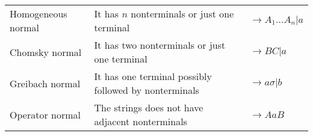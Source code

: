 \begin{table}[H]
{\begin{tabular}{lll}
    Homogeneous normal                & It has $n$ nonterminals or just one terminal                & $\rightarrow A_1 \dots A_n | a$        \\
    Chomsky normal                    & It has two nonterminals or just one terminal                & $\rightarrow BC|a$                     \\
    Greibach normal                   & It has one terminal possibly followed by nonterminals       & $\rightarrow a \sigma|b$               \\
    Operator normal                   & The strings does not have adjacent nonterminals             & $\rightarrow AaB$                      \\ \hline
    \end{tabular}%
    }
\end{table}